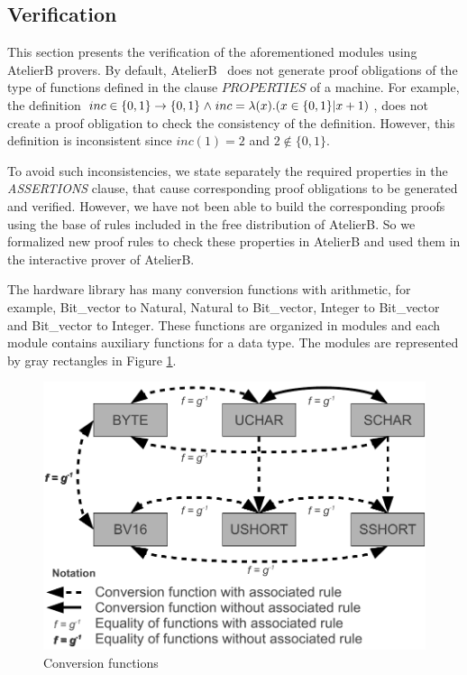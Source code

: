 \documentclass[a4paper]{llncs}
\begin{document}
\subsection{Verification} 
\label{sec:VerificationHardwareLibrary}

This section presents the verification of the aforementioned modules
using AtelierB provers.  By default, AtelierB~\cite{atelierB} does
not generate proof obligations of the type of functions defined in the
clause $PROPERTIES$ of a machine. For example, the definition $inc \in
\{0,1\} \fun \{0,1\} \land inc = \lambda(x).( x \in \{0,1\} | x + 1)$,
does not create a proof obligation to check the consistency of the
definition. However, this definition is inconsistent since $inc(1)=2$
and $ 2 \not\in \{0,1\}$. 

To avoid such inconsistencies, we state separately the required properties in the
\textit{ASSERTIONS\/} clause, that cause corresponding proof obligations to be
generated and verified. However, we have not been able to build the corresponding
proofs using the base of rules included in the free distribution of AtelierB. So
we formalized new proof rules to check these properties in AtelierB and used them
in the interactive prover of AtelierB.

The hardware library has many conversion functions with
arithmetic,  for example, Bit\_vector to Natural, Natural to
Bit\_vector, Integer to Bit\_vector and Bit\_vector to Integer. These
functions are organized in modules and each module contains auxiliary
functions for a data type. The modules are represented by gray
rectangles in Figure \ref{DiagramTypesRules}.


\begin{figure}[he]
\centering
\includegraphics[width=3.in]{images/Diagram_Types_and_Rules.pdf}
\caption{Conversion functions}
\label{DiagramTypesRules}
\end{figure}
\end{document}
